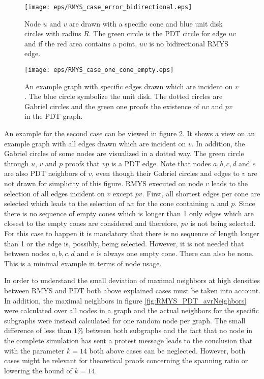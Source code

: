 \begin{figure}[h!]
\centering
\texttt{[image: eps/RMYS\_case\_error\_bidirectional.eps]}
\caption{Node $u $ and $v $ are drawn with a specific cone and blue unit disk circles with radius $R $. The green circle is the PDT circle for edge $uv $ and if the red area contains a point, $uv $ is no bidirectional RMYS edge.}
\label{fig:RMYS_case_error_bidirectional}
\end{figure}


\begin{figure}[h!]
\centering
\texttt{[image: eps/RMYS\_case\_one\_cone\_empty.eps]}
\caption{An example graph with specific edges drawn which are incident on $v $. The blue circle symbolize the unit disk. The dotted circles are Gabriel circles and the green one proofs the existence of $uv $ and $pv $ in the PDT graph.}
\label{fig:RMYS_case_one_cone_empty}
\end{figure}

An example for the second case can be viewed in figure \ref{fig:RMYS_case_one_cone_empty}.
It shows a view on an example graph with all edges drawn which are incident on $v $.
In addition, the Gabriel circles of some nodes are visualized in a dotted way.
The green circle through $u $, $v $ and $p $ proofs that $vp $ is a PDT edge.
Note that nodes $a,b,c,d $ and $e $ are also PDT neighbors of $v $, even though their Gabriel circles and edges to $v $ are not drawn for simplicity of this figure.
RMYS executed on node $v $ leads to the selection of all edges incident on $v $ except $pv $.
First, all shortest edges per cone are selected which leads to the selection of $uv $ for the cone containing $u $ and $p $.
Since there is no sequence of empty cones which is longer than 1 only edges which are closest to the empty cones are considered and therefore, $pv $ is not being selected.
For this case to happen it is mandatory that there is no sequence of length longer than 1 or the edge is, possibly, being selected.
However, it is not needed that between nodes $a,b,c,d $ and $e $ is always one empty cone.
There can also be none.
This is a minimal example in terms of node usage.

In order to understand the small deviation of maximal neighbors at high densities between RMYS and PDT both above explained cases must be taken into account.
In addition, the maximal neighbors in figure \ref{fig:RMYS_PDT_avrNeighbors} were calculated over all nodes in a graph and the actual neighbors for the specific subgraphs were instead calculated for one random node per graph.
The small difference of less than $1 \% $ between both subgraphs and the fact that no node in the complete simulation has sent a protest message leads to the conclusion that with the parameter $k = 14 $ both above cases can be neglected.
However, both cases might be relevant for theoretical proofs concerning the spanning ratio or lowering the bound of $k = 14 $.


